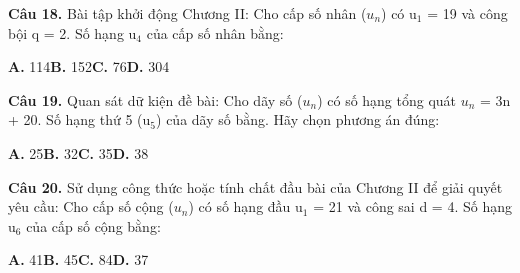 \documentclass[11pt,a4paper]{article}
\begin{document}
\textbf{\color{primary} Câu 18.} Bài tập khởi động Chương II: Cho cấp số nhân ($u_n$) có u$_1$ = 19 và công bội q = 2. Số hạng u$_4$ của cấp số nhân bằng:\par
\hspace*{1.5em}\textbf{A.} 114\quad\quad \textbf{B.} 152\quad\quad \textbf{C.} 76\quad\quad \textbf{D.} 304\par\vspace{2pt}
\textbf{\color{primary} Câu 19.} Quan sát dữ kiện đề bài: Cho dãy số ($u_n$) có số hạng tổng quát $u_n$ = 3n + 20. Số hạng thứ 5 (u$_5$) của dãy số bằng. Hãy chọn phương án đúng:\par
\hspace*{1.5em}\textbf{A.} 25\quad\quad \textbf{B.} 32\quad\quad \textbf{C.} 35\quad\quad \textbf{D.} 38\par\vspace{2pt}
\textbf{\color{primary} Câu 20.} Sử dụng công thức hoặc tính chất đầu bài của Chương II để giải quyết yêu cầu: Cho cấp số cộng ($u_n$) có số hạng đầu u$_1$ = 21 và công sai d = 4. Số hạng u$_6$ của cấp số cộng bằng:\par
\hspace*{1.5em}\textbf{A.} 41\quad\quad \textbf{B.} 45\quad\quad \textbf{C.} 84\quad\quad \textbf{D.} 37\par\vspace{2pt}
\end{document}

